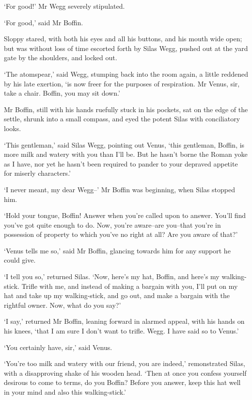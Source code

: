 ‘For good!’ Mr Wegg severely stipulated.

‘For good,’ said Mr Boffin.

Sloppy stared, with both his eyes and all his buttons, and his mouth
wide open; but was without loss of time escorted forth by Silas Wegg,
pushed out at the yard gate by the shoulders, and locked out.

‘The atomspear,’ said Wegg, stumping back into the room again, a
little reddened by his late exertion, ‘is now freer for the purposes of
respiration. Mr Venus, sir, take a chair. Boffin, you may sit down.’

Mr Boffin, still with his hands ruefully stuck in his pockets, sat on
the edge of the settle, shrunk into a small compass, and eyed the potent
Silas with conciliatory looks.

‘This gentleman,’ said Silas Wegg, pointing out Venus, ‘this gentleman,
Boffin, is more milk and watery with you than I’ll be. But he hasn’t
borne the Roman yoke as I have, nor yet he hasn’t been required to
pander to your depraved appetite for miserly characters.’

‘I never meant, my dear Wegg--’ Mr Boffin was beginning, when Silas
stopped him.

‘Hold your tongue, Boffin! Answer when you’re called upon to answer.
You’ll find you’ve got quite enough to do. Now, you’re aware--are
you--that you’re in possession of property to which you’ve no right at
all? Are you aware of that?’

‘Venus tells me so,’ said Mr Boffin, glancing towards him for any
support he could give.

‘I tell you so,’ returned Silas. ‘Now, here’s my hat, Boffin, and here’s
my walking-stick. Trifle with me, and instead of making a bargain with
you, I’ll put on my hat and take up my walking-stick, and go out, and
make a bargain with the rightful owner. Now, what do you say?’

‘I say,’ returned Mr Boffin, leaning forward in alarmed appeal, with his
hands on his knees, ‘that I am sure I don’t want to trifle. Wegg. I have
said so to Venus.’

‘You certainly have, sir,’ said Venus.

‘You’re too milk and watery with our friend, you are indeed,’
remonstrated Silas, with a disapproving shake of his wooden head. ‘Then
at once you confess yourself desirous to come to terms, do you Boffin?
Before you answer, keep this hat well in your mind and also this
walking-stick.’

